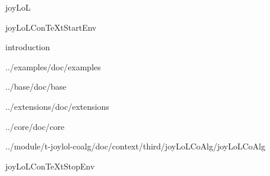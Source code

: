 
\usemodule[t-diSimp]

\startDiSimpComponent joyLoL

\diSimpEnvironment joyLoLConTeXtStartEnv

\diSimpComponent introduction

\diSimpComponent ../examples/doc/examples

\diSimpComponent ../base/doc/base

\diSimpComponent ../extensions/doc/extensions

\diSimpComponent ../core/doc/core

\diSimpComponent ../module/t-joylol-coalg/doc/context/third/joyLoLCoAlg/joyLoLCoAlg

\diSimpEnvironment joyLoLConTeXtStopEnv

\stopDiSimpComponent
